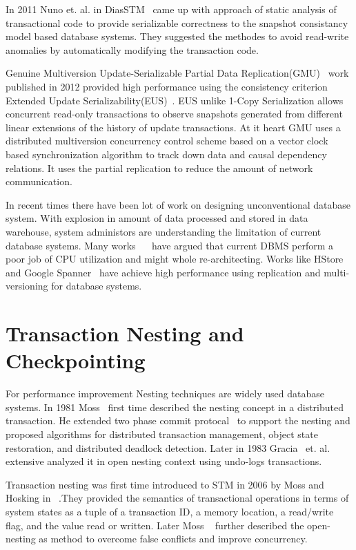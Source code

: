 \documentclass[12pt,english]{report}
\begin{document}
In 2011 Nuno et. al. in DiasSTM~\cite{dias2011efficient} came up with approach of static analysis of transactional code to provide serializable correctness to the snapshot consistancy model based database systems. They suggested the methodes to avoid read-write anomalies by automatically modifying the transaction code.

Genuine Multiversion Update-Serializable Partial Data Replication(GMU)~\cite{GMU:peluso2012scalability} work published in 2012 provided high performance using the consistency criterion Extended Update Serializability(EUS)~\cite{EUS:HansdahPatnaik}. EUS unlike 1-Copy Serialization allows concurrent read-only transactions to observe snapshots generated from different linear extensions of the history of update transactions. At it heart GMU uses a distributed multiversion concurrency control scheme based on a vector clock based synchronization algorithm to track down data and causal dependency relations. It uses the partial replication to reduce the amount of network communication.

In recent times there have been lot of work on designing unconventional database system. With explosion in amount of data processed and stored in data warehouse, system administors are understanding the limitation of current database systems. Many works ~\cite{Stonebraker:2007:EAE:1325851.1325981}~\cite{harizopoulos2008oltp} have argued that current DBMS perform a poor job of CPU utilization and might whole re-architecting. Works like HStore~\cite{HSTORE:kallman2008h} and Google Spanner~\cite{corbett2012spanner} have achieve high performance using replication and multi-versioning for database systems.  

\section{Transaction Nesting and Checkpointing}

For performance improvement Nesting techniques are widely used database systems. In 1981 Moss~\cite{moss1981nested} first time described the nesting concept in a distributed transaction. He extended two phase commit protocal~\cite{TwoPC:weikum1991principles} to support the nesting and proposed algorithms for distributed transaction management, object state restoration, and distributed deadlock detection. Later in 1983 Gracia~\cite{garcia1983using} et. al. extensive analyzed it in open nesting context using undo-logs transactions. 

Transaction nesting was first time introduced to STM in 2006 by  Moss and Hosking in ~\cite{moss2006nested}.They provided the semantics of transactional operations in terms of
system states as a tuple of a transaction ID, a memory location, a read/write flag, and the value read or written. Later Moss ~\cite{moss2006open} further described the open-nesting as 
method to overcome false conflicts and improve concurrency. 
\end{document}
